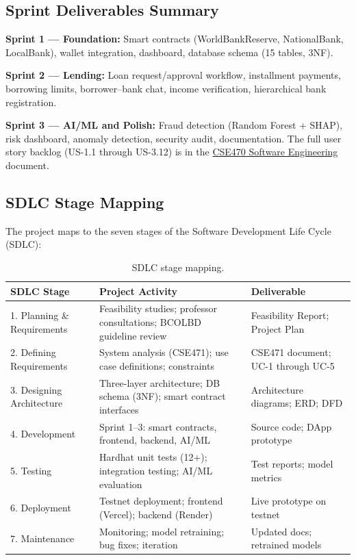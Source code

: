 \documentclass[11pt,a4paper]{article}
\newcommand{\tableheadfont}{\bfseries\small\color{PrimaryBlue}}
\newenvironment{moderntable}[1][H]{%
    \begin{table}[#1]\centering\small%
    \renewcommand{\arraystretch}{1.35}%
}{%
    \end{table}%
}
\begin{document}
\subsection{Sprint Deliverables Summary}

\textbf{Sprint 1 --- Foundation:} Smart contracts (WorldBankReserve, NationalBank, LocalBank), wallet integration, dashboard, database schema (15 tables, 3NF).

\textbf{Sprint 2 --- Lending:} Loan request/approval workflow, installment payments, borrowing limits, borrower--bank chat, income verification, hierarchical bank registration.

\textbf{Sprint 3 --- AI/ML and Polish:} Fraud detection (Random Forest + SHAP), risk dashboard, anomaly detection, security audit, documentation. The full user story backlog (US-1.1 through US-3.12) is in the \href{https://github.com/Yuvraajrahman/Cryto-World-Bank/blob/main/Documentation/CSE470_SOFTWARE_ENGINEERING.md}{CSE470 Software Engineering} document.

\subsection{SDLC Stage Mapping}

The project maps to the seven stages of the Software Development Life Cycle (SDLC):

\begin{moderntable}
\caption{SDLC stage mapping.}
\begin{tabular}{@{} >{\raggedright}p{2.8cm} >{\raggedright}p{4.5cm} >{\raggedright\arraybackslash}p{4.5cm} @{}}
\toprule
\tableheadfont SDLC Stage & \tableheadfont Project Activity & \tableheadfont Deliverable \\
\midrule
\rowcolor{RowShade}
1. Planning \& Requirements & Feasibility studies; professor consultations; BCOLBD guideline review & Feasibility Report; Project Plan \\
2. Defining Requirements & System analysis (CSE471); use case definitions; constraints & CSE471 document; UC-1 through UC-5 \\
\rowcolor{RowShade}
3. Designing Architecture & Three-layer architecture; DB schema (3NF); smart contract interfaces & Architecture diagrams; ERD; DFD \\
4. Development & Sprint 1--3: smart contracts, frontend, backend, AI/ML & Source code; DApp prototype \\
\rowcolor{RowShade}
5. Testing & Hardhat unit tests (12+); integration testing; AI/ML evaluation & Test reports; model metrics \\
6. Deployment & Testnet deployment; frontend (Vercel); backend (Render) & Live prototype on testnet \\
\rowcolor{RowShade}
7. Maintenance & Monitoring; model retraining; bug fixes; iteration & Updated docs; retrained models \\
\bottomrule
\end{tabular}
\end{moderntable}
\end{document}

